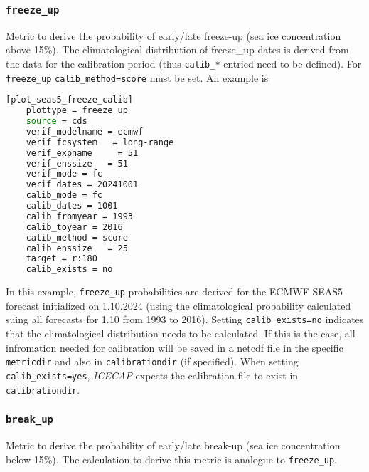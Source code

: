 \documentclass[DIV=10, parskip=full]{scrreprt}
\newcommand{\ice}{\textit{ICECAP}\xspace}
\begin{document}
\subsubsection{\texttt{freeze\_up}}
Metric to derive the probability of early/late freeze-up (sea ice concentration above 15\%). The climatological distribution of freeze\_up dates is derived from the data for the calibration period (thus \texttt{calib\_*} entried need to be defined). For \texttt{freeze\_up} \texttt{calib\_method=score} must be set. An example is

\begin{lstlisting}[language=bash]
[plot_seas5_freeze_calib]
	plottype = freeze_up
	source = cds
	verif_modelname = ecmwf
	verif_fcsystem   = long-range
	verif_expname     = 51
	verif_enssize   = 51
	verif_mode = fc
	verif_dates = 20241001
	calib_mode = fc
	calib_dates = 1001
	calib_fromyear = 1993
	calib_toyear = 2016
	calib_method = score
	calib_enssize   = 25
	target = r:180
	calib_exists = no
\end{lstlisting}

In this example, \texttt{freeze\_up} probabilities are derived for the ECMWF SEAS5 forecast initialized on 1.10.2024 (using the climatological probability calculated suing all forecasts for 1.10 from 1993 to 2016). Setting \texttt{calib\_exists=no} indicates that the climatological distribution needs to be calculated. If this is the case, all infromation needed for calibration will be saved in a netcdf file in the specific \texttt{metricdir} and also in \texttt{calibrationdir} (if specified). When setting \texttt{calib\_exists=yes}, \ice expects the calibration file to exist in \texttt{calibrationdir}.

\subsubsection{\texttt{break\_up}}
Metric to derive the probability of early/late break-up (sea ice concentration below 15\%). The calculation to derive this metric is analogue to \texttt{freeze\_up}.
\end{document}
